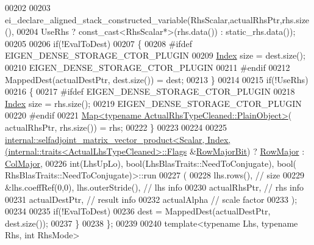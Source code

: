 \begin{DoxyCode}
00202                                                   
00203     ei\_declare\_aligned\_stack\_constructed\_variable(RhsScalar,actualRhsPtr,rhs.size(),
00204         UseRhs ? \textcolor{keyword}{const\_cast<}RhsScalar*\textcolor{keyword}{>}(rhs.data()) : static\_rhs.data());
00205     
00206     \textcolor{keywordflow}{if}(!EvalToDest)
00207     \{
00208 \textcolor{preprocessor}{      #ifdef EIGEN\_DENSE\_STORAGE\_CTOR\_PLUGIN}
00209       \hyperlink{namespace_eigen_a62e77e0933482dafde8fe197d9a2cfde}{Index} size = dest.size();
00210       EIGEN\_DENSE\_STORAGE\_CTOR\_PLUGIN
00211 \textcolor{preprocessor}{      #endif}
00212       MappedDest(actualDestPtr, dest.size()) = dest;
00213     \}
00214       
00215     \textcolor{keywordflow}{if}(!UseRhs)
00216     \{
00217 \textcolor{preprocessor}{      #ifdef EIGEN\_DENSE\_STORAGE\_CTOR\_PLUGIN}
00218       \hyperlink{namespace_eigen_a62e77e0933482dafde8fe197d9a2cfde}{Index} size = rhs.size();
00219       EIGEN\_DENSE\_STORAGE\_CTOR\_PLUGIN
00220 \textcolor{preprocessor}{      #endif}
00221       \hyperlink{group___core___module_class_eigen_1_1_map}{Map<typename ActualRhsTypeCleaned::PlainObject>}(
      actualRhsPtr, rhs.size()) = rhs;
00222     \}
00223       
00224       
00225     
      \hyperlink{struct_eigen_1_1internal_1_1selfadjoint__matrix__vector__product}{internal::selfadjoint\_matrix\_vector\_product<Scalar, Index, (internal::traits<ActualLhsTypeCleaned>::Flags}
      &\hyperlink{group__flags_gae4f56c2a60bbe4bd2e44c5b19cbe8762}{RowMajorBit}) ? \hyperlink{group__enums_ggaacded1a18ae58b0f554751f6cdf9eb13acfcde9cd8677c5f7caf6bd603666aae3}{RowMajor} : \hyperlink{group__enums_ggaacded1a18ae58b0f554751f6cdf9eb13a0cbd4bdd0abcfc0224c5fcb5e4f6669a}{ColMajor},
00226                                                 \textcolor{keywordtype}{int}(LhsUpLo), bool(LhsBlasTraits::NeedToConjugate), bool(
      RhsBlasTraits::NeedToConjugate)>::run
00227       (
00228         lhs.rows(),                             \textcolor{comment}{// size}
00229         &lhs.coeffRef(0,0),  lhs.outerStride(), \textcolor{comment}{// lhs info}
00230         actualRhsPtr,                           \textcolor{comment}{// rhs info}
00231         actualDestPtr,                          \textcolor{comment}{// result info}
00232         actualAlpha                             \textcolor{comment}{// scale factor}
00233       );
00234     
00235     \textcolor{keywordflow}{if}(!EvalToDest)
00236       dest = MappedDest(actualDestPtr, dest.size());
00237   \}
00238 \};
00239 
00240 \textcolor{keyword}{template}<\textcolor{keyword}{typename} Lhs, \textcolor{keyword}{typename} Rhs, \textcolor{keywordtype}{int} RhsMode>

\end{DoxyCode}
